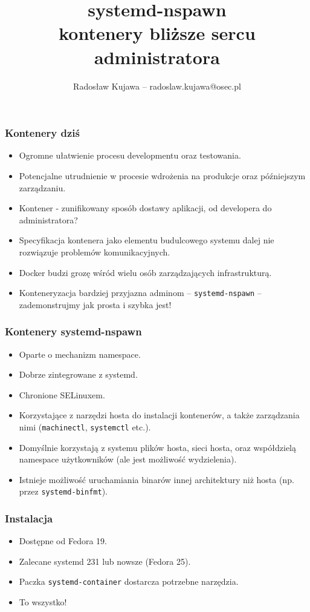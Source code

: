 \documentclass[dvipsnames,table]{beamer}
\title{systemd-nspawn \\ kontenery bliższe sercu administratora}
\author{Radosław Kujawa -- radoslaw.kujawa@osec.pl}
\institute{OSEC}
\begin{document}
\begin{frame}
	\titlepage
\end{frame}



\begin{frame}
\frametitle{Kontenery dziś}
\begin{itemize}
	\item Ogromne ułatwienie procesu developmentu oraz testowania.
	\item Potencjalne utrudnienie w procesie wdrożenia na produkcje oraz późniejszym zarządzaniu.
	\item Kontener - zunifikowany sposób dostawy aplikacji, od developera do administratora?
	\item Specyfikacja kontenera jako elementu budulcowego systemu dalej nie rozwiązuje problemów komunikacyjnych. 
	\item Docker budzi grozę wśród wielu osób zarządzających infrastrukturą.
	\item Konteneryzacja bardziej przyjazna adminom -- {\tt systemd-nspawn} -- zademonstrujmy jak prosta i szybka jest!
\end{itemize}
\end{frame}

\begin{frame}
\frametitle{Kontenery systemd-nspawn}
\begin{itemize}
	\item Oparte o mechanizm namespace.
	\item Dobrze zintegrowane z systemd.
	\item Chronione SELinuxem.
	\item Korzystające z narzędzi hosta do instalacji kontenerów, a także zarządzania nimi ({\tt machinectl}, {\tt systemctl} etc.).
	\item Domyślnie korzystają z systemu plików hosta, sieci hosta, oraz współdzielą namespace użytkowników (ale jest możliwość wydzielenia).
	\item Istnieje możliwość uruchamiania binarów innej architektury niż hosta (np. przez {\tt systemd-binfmt}).
\end{itemize}
\end{frame}

\begin{frame}
\frametitle{Instalacja}
\begin{itemize}
	\item Dostępne od Fedora 19.
	\item Zalecane systemd 231 lub nowsze (Fedora 25).
	\item Paczka {\tt systemd-container} dostarcza potrzebne narzędzia.
	\item To wszystko! \Smiley
\end{itemize}
\end{frame}
\end{document}
